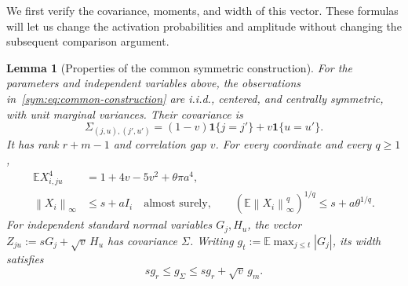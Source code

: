 \documentclass[11pt,letterpaper]{article}
\newtheorem{lemma}{Lemma}
\theoremstyle{remark}
\newcommand{\E}{\mathbb E}
\newcommand{\norm}[1]{\left\lVert#1\right\rVert}
\newcommand{\ind}{\mathbf 1}
\begin{document}
We first verify the covariance, moments, and width of this vector.
These formulas will let us change the activation probabilities
and amplitude without changing the subsequent comparison argument.

\begin{lemma}[Properties of the common symmetric construction]
\label{lower:family-properties}
For the parameters and independent variables above, the observations
in~\eqref{sym:eq:common-construction} are i.i.d., centered, and
centrally symmetric, with unit marginal variances. Their covariance is
\begin{equation}
 \Sigma_{(j,u),(j',u')}=(1-v)\ind\{j=j'\}+v\ind\{u=u'\}.
 \label{sym:eq:common-covariance}
\end{equation}
It has rank $r+m-1$ and correlation gap $v$. For every
coordinate and every $q\ge1$,
\begin{align}
 \E X_{i,ju}^4
 &=1+4v-5v^2+\theta\pi a^4,
 \label{lower:eq:family-fourth}\\
 \norm{X_i}_\infty&\le s+aI_i\quad\text{almost surely},\qquad
 (\E\norm{X_i}_\infty^q)^{1/q}\le s+a\theta^{1/q}.
 \label{lower:eq:family-envelope}
\end{align}
For independent standard normal variables $G_j,H_u$, the vector
$Z_{ju}:=sG_j+\sqrt v\,H_u$ has covariance $\Sigma$.
Writing $g_t:=\E\max_{j\le t}|G_j|$, its width satisfies
\begin{equation}
 s g_r\le g_\Sigma\le s g_r+\sqrt v\,g_m.
 \label{lower:eq:family-width}
\end{equation}
\end{lemma}
\end{document}
